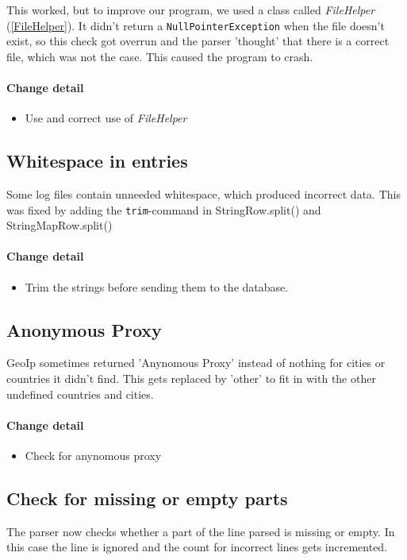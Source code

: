 This worked, but to improve our program, we used a class called \textit{FileHelper} (\ref{FileHelper}). 
It didn't return a \texttt{NullPointerException} when the file doesn't exist, 
so this check got overrun and the parser 'thought' that there is a correct file, which was not the case.
This caused the program to crash. 

\paragraph{Change detail}
\begin{itemize}
  \item Use and correct use of \textit{FileHelper}
\end{itemize}

\subsection{Whitespace in entries}
Some log files contain unneeded whitespace, which produced incorrect data. 
This was fixed by adding the \texttt{trim}-command in StringRow.split() and StringMapRow.split()

\paragraph{Change detail}
\begin{itemize}
  \item Trim the strings before sending them to the database.
\end{itemize}

\subsection{Anonymous Proxy}
GeoIp sometimes returned 'Anynomous Proxy' instead of nothing for cities or countries it didn't find.
This gets replaced by 'other' to fit in with the other undefined countries and cities.


\paragraph{Change detail}
\begin{itemize}
  \item Check for anynomous proxy
\end{itemize}

\subsection{Check for missing or empty parts}
The parser now checks whether a part of the line parsed is missing or empty. In this case the line is ignored and 
the count for incorrect lines gets incremented.

